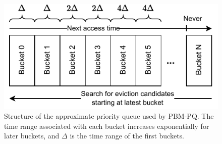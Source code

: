 \begin{figure}
    \centering
    \includegraphics[width=1\columnwidth]{figures/Diagrams/diagrams-approx-PQ.pdf}
    \caption[PBM-PQ's approximate priority queue]{Structure of the approximate priority queue used by PBM-PQ. The time range associated with each bucket increases exponentially for later buckets, and $\Delta$ is the time range of the first buckets.}
    \label{fig:approx-pq}
\end{figure}